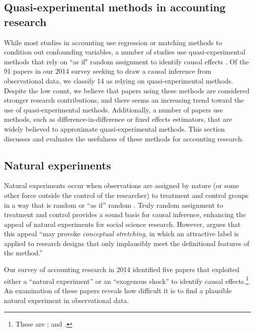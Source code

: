 \documentclass[12pt,reqno,titlepage]{amsart}
\theoremstyle{definition}
\begin{document}
\begin{doublespace}
\section{Quasi-experimental methods in accounting research} \label{sec:quasi}
While most studies in accounting use regression or matching methods to condition out confounding variables, a number of studies use quasi-experimental methods that rely on ``as if" random assignment to identify causal effects \citep{Dunning:2012tt}.
Of the 91 papers in our 2014 survey seeking to draw a causal inference from observational data, we classify 14 as relying on quasi-experimental methods.
Despite the low count, we believe that papers using these methods are considered stronger research contributions, and there seems an increasing trend toward the use of quasi-experimental methods.
Additionally, a number of papers use methods, such as difference-in-difference or fixed effects estimators, that are widely believed to approximate quasi-experimental methods.
This section discusses and evaluates the usefulness of these methods for accounting research. 

\subsection{Natural experiments}
Natural experiments occur when observations are assigned by nature (or some other force outside the control of the researcher) to treatment and control groups in a way that is random or ``as if'' random \citep{Dunning:2012tt}. 
Truly random assignment to treatment and control provides a sound basis for causal inference, enhancing the appeal of natural experiments for social science research.
However, \citet[\,p.3, emphasis added]{Dunning:2012tt} argues that this appeal ``may provoke \emph{conceptual stretching}, in which an attractive label is applied to research designs that only implausibly meet the definitional features of the method.'' 

Our survey of accounting research in 2014 identified five papers that exploited either a ``natural experiment'' or an ``exogenous shock'' to identify causal effects.\footnote{These are \citet{Lo:2013jk,Aier:2014ii,Kirk:2014gx,Houston:2014hv}; and \citet{Hail:2014fq}.}
An examination of these papers reveals how difficult it is to find a plausible natural experiment in observational data.


\end{doublespace}
\end{document}
